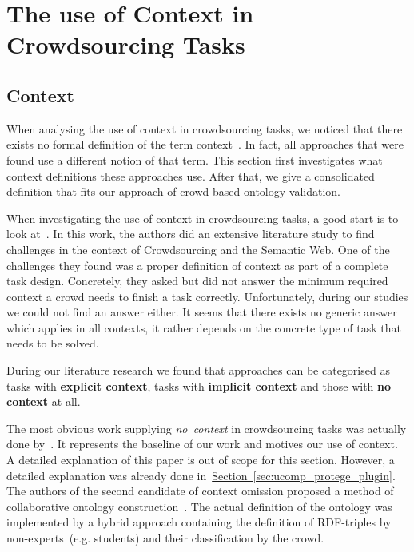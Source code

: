 \section{The use of Context in Crowdsourcing Tasks}
% 

\subsection{Context}
When analysing the use of context in crowdsourcing tasks, we noticed that there exists no formal definition of the term \guillemotright context\guillemotleft~. In fact, all approaches that were found use a different notion of that term. 
This section first investigates what context definitions these approaches use. After that, we give a consolidated definition that fits our approach of crowd-based ontology validation.

When investigating the use of context in crowdsourcing tasks, a good start is to look at~\cite{sarasua2015crowdsourcing}. In this work, the authors did an extensive literature study to find challenges in the context of Crowdsourcing and the Semantic Web. One of the challenges they found was a proper definition of context as part of a complete task design. Concretely, they asked but did not answer the minimum required context a crowd needs to finish a task correctly. Unfortunately, during our studies we could not find an answer either. It seems that there exists no generic answer which applies in all contexts, it rather depends on the concrete type of task that needs to be solved. 

During our literature research we found that approaches can be categorised as tasks with \textbf{explicit context}, tasks with \textbf{implicit context} and those with \textbf{no context} at all. 

The most obvious work supplying \emph{no~context} in crowdsourcing tasks was actually done by~\cite{wohlgenannt2016}. It represents the baseline of our work and motives our use of context. A detailed explanation of this paper is out of scope for this section. However, a detailed explanation was already done in~\hyperref[sec:ucomp_protege_plugin]{Section~\ref*{sec:ucomp_protege_plugin}}. The authors of the second candidate of context omission proposed a method of collaborative ontology construction~\cite{zhitomirsky2017}. The actual definition of the ontology was implemented by a hybrid approach containing the definition of RDF-triples by non-experts~(e.g. students) and their classification by the crowd.

